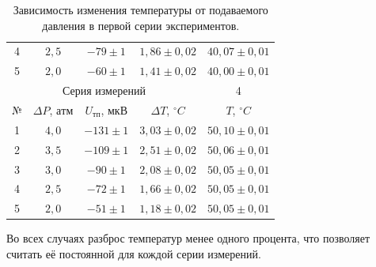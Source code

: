 \documentclass[a4paper,11pt]{article}
\begin{document}
\begin{table}[h!]
\begin{tabular}{ ||c|c|c|c|c|| }
  4 & $2,5$ &  $-79 \pm 1$ & $1,86 \pm 0,02$ & $40,07 \pm 0,01$ \\
  5 & $2,0$ &  $-60 \pm 1$ & $1,41 \pm 0,02$ & $40,00 \pm 0,01$ \\
  \hline
  \hline
  \multicolumn{4}{||c|}{Серия измерений} & 4 \\
  \hline
  № & $\Delta P$, $атм$ & $U_{тп}$, $мкВ$ & $\Delta T$, $^{\circ}C$ & $T$, $^{\circ}C$ \\
  \hline
  1 & $4,0$ & $-131 \pm 1$ & $3,03 \pm 0,02$ & $50,10 \pm 0,01$ \\
  2 & $3,5$ & $-109 \pm 1$ & $2,51 \pm 0,02$ & $50,06 \pm 0,01$ \\
  3 & $3,0$ &  $-90 \pm 1$ & $2,08 \pm 0,02$ & $50,05 \pm 0,01$ \\
  4 & $2,5$ &  $-72 \pm 1$ & $1,66 \pm 0,02$ & $50,05 \pm 0,01$ \\
  5 & $2,0$ &  $-51 \pm 1$ & $1,18 \pm 0,02$ & $50,05 \pm 0,01$ \\
  \hline
\end{tabular}
    \caption{Зависимость изменения температуры от подаваемого давления в первой серии экспериментов.}
\label{table:tab1}
\end{table}\newline
Во всех случаях разброс температур менее одного процента, что позволяет считать её постоянной для кождой серии измерений.
\end{document}

